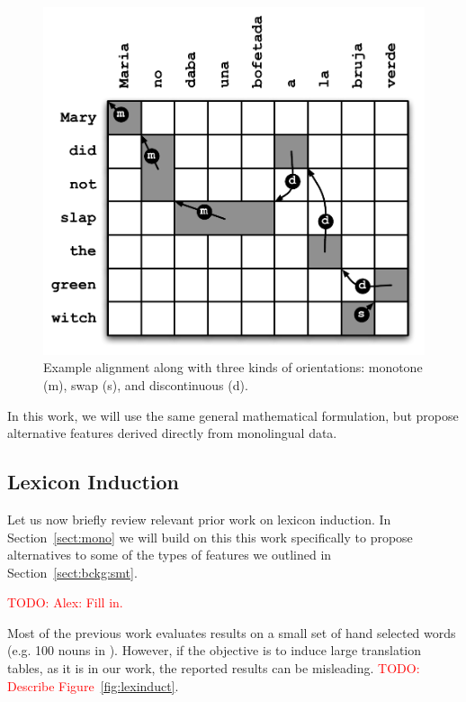 \documentclass[11pt]{article}
\newcommand{\mnote}[1]{\marginpar{%
  \vskip-\baselineskip
  \raggedright\footnotesize
  \itshape\hrule\smallskip\tiny{#1}\par\smallskip\hrule}}
\newcommand{\mtodo}[1]{\mnote{\textcolor{red}{#1}}}
\newcommand{\todo}[1]{\textcolor{red}{TODO: #1}}
\newcommand{\secref}[1]{Section~\ref{#1}}
\newcommand{\figref}[1]{Figure~\ref{#1}}
\begin{document}
\begin{figure}[t]
\vskip 0.1in
\begin{center}
\centerline{\includegraphics[scale=0.5]{../figures/reorderfeats/reorderfeats.pdf}} %
\caption{Example alignment along with three kinds of orientations: monotone (m), swap (s), and discontinuous (d). }
\label{fig:reorderfeats}
\end{center}
\end{figure}

In this work, we will use the same general mathematical formulation, but propose alternative features derived directly from monolingual data.

 \subsection{Lexicon Induction} \label{sect:bckg:lexind}
 
Let us now briefly review relevant prior work on lexicon induction.  In \secref{sect:mono} we will build on this this work specifically to propose alternatives to some of the types of features we outlined in \secref{sect:bckg:smt}.

\todo{Alex: Fill in.}

Most of the previous work evaluates results on a small set of hand selected words (e.g. 100 nouns in \cite{Rapp:1995}).  However, if the objective is to induce large translation tables, as it is in our work, the reported results can be misleading. \todo{Describe \figref{fig:lexinduct}}. \mtodo{Diss prev work, but make sure that it comes across that these features are informative.}
\end{document}
